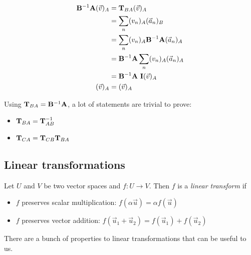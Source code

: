 \begin{equation}
\begin{aligned}
\mathbf{B}^{-1} \mathbf{A} (\vec{v})_A &= \mathbf{T}_{BA}  (\vec{v})_A \\
                                   &= \sum_n (v_n)_A (\vec{a}_n)_B \\
                                   &= \sum_n (v_n)_A \mathbf{B}^{-1} \mathbf{A} (\vec{a}_n)_A \\
                                   &= \mathbf{B}^{-1} \mathbf{A} \sum_n (v_n)_A (\vec{a}_n)_A \\
                                   &= \mathbf{B}^{-1} \mathbf{A} \text{  } \mathbf{I} (\vec{v})_A \\
                    (\vec{v})_A &=  (\vec{v})_A         
\end{aligned}
\end{equation}

Using $\mathbf{T}_{BA} = \mathbf{B}^{-1}\mathbf{A}$, a lot of statements are trivial to prove:
\begin{itemize}
    \item $\mathbf{T}_{BA} = \mathbf{T}_{AB}^{-1}$
    \item $\mathbf{T}_{CA} = \mathbf{T}_{CB} \mathbf{T}_{BA}$
\end{itemize}


\subsection{Linear transformations}

\begin{definition}
Let $U$ and $V$ be two vector spaces and $f:U \to V$. Then $f$ is a \emph{linear transform} if
\begin{itemize}
    \item $f$ preserves scalar multiplication: $f(\alpha \vec{u}) = \alpha f(\vec{u})$
    \item $f$ preserves vector addition: $f(\vec{u}_1 + \vec{u}_2) = f(\vec{u}_1) + f(\vec{u}_2)$
\end{itemize}
\end{definition}

There are a bunch of properties to linear transformations that can be useful to us. 

